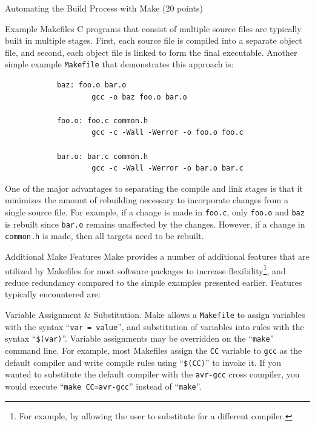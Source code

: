 \documentclass{article}
\begin{document}
\begin{section}{Automating the Build Process with Make (20 points)}
\begin{subsection}{Example Makefiles}
			C programs that consist of multiple source files are typically built in
			multiple stages.  First, each source file is compiled into a separate
			object file, and second, each object file is linked to form the final
			executable.  Another simple example \texttt{Makefile} that demonstrates
			this approach is:
			\begin{verbatim}
			baz: foo.o bar.o
			        gcc -o baz foo.o bar.o

			foo.o: foo.c common.h
			        gcc -c -Wall -Werror -o foo.o foo.c

			bar.o: bar.c common.h
			        gcc -c -Wall -Werror -o bar.o bar.c
			\end{verbatim}
			One of the major advantages to separating the compile and link stages is
			that it minimizes the amount of rebuilding necessary to incorporate changes
			from a single source file.  For example, if a change is made in
			\texttt{foo.c}, only \texttt{foo.o} and \texttt{baz} is rebuilt since
			\texttt{bar.o} remains unaffected by the changes.  However, if a change in
			\texttt{common.h} is made, then all targets need to be rebuilt.
		\end{subsection}

		\begin{subsection}{Additional Make Features}
			Make provides a number of additional features that are utilized by
			Makefiles for most software packages to increase flexibility\footnote{For
			example, by allowing the user to substitute for a different compiler.}, and
			reduce redundancy compared to the simple examples presented earlier.
			Features typically encountered are:

			\begin{paragraph}{Variable Assignment \& Substitution.}
				Make allows a \texttt{Makefile} to assign variables with the syntax
				``\verb|var = value|'', and substitution of variables into rules with the
				syntax ``\verb|$(var)|''.  Variable assignments may be overridden on the
				``\verb|make|'' command line.  For example, most Makefiles assign the
				\texttt{CC} variable to \texttt{gcc} as the default compiler and write
				compile rules using ``\verb|$(CC)|'' to invoke it.  If you wanted to
				substitute the default compiler with the \texttt{avr-gcc} cross compiler,
				you would execute ``\verb|make CC=avr-gcc|'' instead of ``\verb|make|''.
			\end{paragraph}


\end{subsection}
\end{section}
\end{document}
